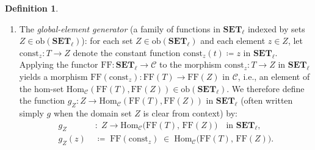 \documentclass[11pt,a4paper]{article}
\theoremstyle{definition}
\newtheorem{definition}[theorem]{Definition}
\theoremstyle{remark}
\newcommand{\Set}{\mathbf{SET}}
\newcommand{\Hom}{\mathrm{Hom}}
\newcommand{\FF}{\mathrm{FF}}
\newcommand{\const}{\mathrm{const}}
\begin{document}
\begin{definition}
\begin{enumerate}[label=(\roman*),nosep]
  $G(y2x) = \FF(f \mapsto f \star y2x) : G(Y) \to G(X)$ for $y2x : Y \to X$.
\vspace{4 pt}
  \item The \emph{global-element generator} (a family of functions in $\Set_\ell$ indexed by sets
  $Z \in \mathrm{ob}(\Set_\ell)$): for each set $Z \in \mathrm{ob}(\Set_\ell)$ and each element
  $z \in Z$, let $\const_z : T \to Z$ denote the constant function $\const_z(t) \coloneqq z$ in
  $\Set_\ell$. Applying the functor $\FF : \Set_\ell \to \mathcal{C}$ to the morphism
  $\const_z : T \to Z$ in $\Set_\ell$ yields a morphism $\FF(\const_z) : \FF(T) \to \FF(Z)$ in
  $\mathcal{C}$, i.e., an element of the hom-set $\Hom_{\mathcal{C}}(\FF(T), \FF(Z)) \in \mathrm{ob}(\Set_\ell)$.
  We therefore define the function $g_Z : Z \to \Hom_{\mathcal{C}}(\FF(T), \FF(Z))$ in $\Set_\ell$
  (often written simply $g$ when the domain set $Z$ is clear from context) by:
  \begin{equation}\label{eq:def-g}
    \begin{aligned}
      g_Z &\;:\; Z \longrightarrow \Hom_{\mathcal{C}}\bigl(\FF(T),\, \FF(Z)\bigr)
      \quad\text{in }\Set_\ell, \\
      g_Z(z) &\;\coloneqq\; \FF(\const_z) \;\in\; \Hom_{\mathcal{C}}\bigl(\FF(T),\, \FF(Z)\bigr).
    \end{aligned}
  \end{equation}
\end{enumerate}
\end{definition}
\end{document}
